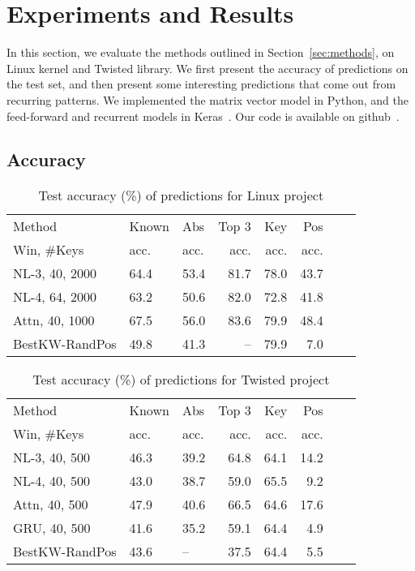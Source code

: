 \section{Experiments and Results}
\label{sec:results}

In this section, we evaluate the methods outlined in Section~\ref{sec:methods},
on Linux kernel and Twisted library. We first present the accuracy of
predictions on the test set, and then present some interesting predictions that
come out from recurring patterns. We implemented the matrix vector model in
Python, and the feed-forward and recurrent models in Keras~\cite{ref:keras}.
Our code is available on github~\cite{ref:codecompletion}.

\subsection{Accuracy}
\label{sec:accuracy}

\begin{table}[h]
  \centering
  \begin{tabular}{l l l r r r r r}
    \hline
    Method & Known & Abs & Top 3 & Key & Pos \\
    Win, \#Keys & acc. & acc. & acc.  & acc. & acc. \\
    \hline
    NL-3, 40, 2000 & 64.4 & 53.4 & 81.7 & 78.0 & 43.7\\
    NL-4, 64, 2000 & 63.2 & 50.6 & 82.0 & 72.8 & 41.8\\
    Attn, 40, 1000 & 67.5 & 56.0 & 83.6 & 79.9 & 48.4\\
    BestKW-RandPos & 49.8 & 41.3 & -- & 79.9 & 7.0\\
    \hline
  \end{tabular}
  \caption{Test accuracy (\%) of predictions for Linux project}
  \label{tab:linux}
\end{table}

\begin{table}[h]
  \centering
  \begin{tabular}{l l l r r r r r}
    \hline
    Method & Known & Abs & Top 3 & Key & Pos \\
    Win, \#Keys & acc. & acc. & acc.  & acc. & acc. \\
    \hline
    NL-3, 40, 500 & 46.3 & 39.2 & 64.8 & 64.1 & 14.2\\
    NL-4, 40, 500 & 43.0 & 38.7 & 59.0 & 65.5 & 9.2\\
    Attn, 40, 500 & 47.9 & 40.6 & 66.5 & 64.6 & 17.6\\
    GRU, 40, 500 & 41.6 & 35.2 & 59.1 & 64.4 & 4.9\\
    BestKW-RandPos & 43.6 & -- & 37.5 & 64.4 & 5.5\\
    \hline
  \end{tabular}
  \caption{Test accuracy (\%) of predictions for Twisted project}
  \label{tab:twisted}
\end{table}

